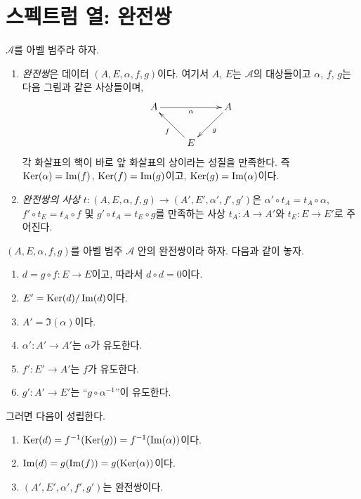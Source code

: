 \section{스펙트럼 열: 완전쌍}
\label{section-exact-couple}

\begin{definition}
\label{definition-exact-couple}
$\mathcal{A}$를 아벨 범주라 하자.
\begin{enumerate}
\item {\it 완전쌍}은 데이터 $(A, E, \alpha, f, g)$이다. 여기서 $A$, $E$는
$\mathcal{A}$의 대상들이고 $\alpha$, $f$, $g$는 다음 그림과 같은
사상들이며,
$$
\xymatrix{
A \ar[rr]_{\alpha} & & A \ar[ld]^g \\
& E \ar[lu]^f &
}
$$
각 화살표의 핵이 바로 앞 화살표의 상이라는 성질을 만족한다. 즉
$\mathop{\mathrm{Ker}}(\alpha) = \mathop{\mathrm{Im}}(f)$,
$\mathop{\mathrm{Ker}}(f) = \mathop{\mathrm{Im}}(g)$이고, $\mathop{\mathrm{Ker}}(g) = \mathop{\mathrm{Im}}(\alpha)$이다.
\item {\it 완전쌍의 사상}
$t : (A, E, \alpha, f, g) \to (A', E', \alpha', f', g')$은
$\alpha' \circ t_A = t_A \circ \alpha$,
$f' \circ t_E = t_A \circ f$ 및
$g' \circ t_A = t_E \circ g$를 만족하는 사상
$t_A : A \to A'$와 $t_E : E \to E'$로 주어진다.
\end{enumerate}
\end{definition}

\begin{lemma}
\label{lemma-derived-exact-couple}
$(A, E, \alpha, f, g)$를 아벨 범주 $\mathcal{A}$ 안의 완전쌍이라 하자.
다음과 같이 놓자.
\begin{enumerate}
\item $d = g \circ f : E \to E$이고, 따라서 $d \circ d = 0$이다.
\item $E' = \mathop{\mathrm{Ker}}(d)/\mathop{\mathrm{Im}}(d)$이다.
\item $A' = \Im(\alpha)$이다.
\item $\alpha' : A' \to A'$는 $\alpha$가 유도한다.
\item $f' : E' \to A'$는 $f$가 유도한다.
\item $g' : A' \to E'$는 ``$g \circ \alpha^{-1}$''이 유도한다.
\end{enumerate}
그러면 다음이 성립한다.
\begin{enumerate}
\item $\mathop{\mathrm{Ker}}(d) = f^{-1}(\mathop{\mathrm{Ker}}(g)) = f^{-1}(\mathop{\mathrm{Im}}(\alpha))$이다.
\item $\mathop{\mathrm{Im}}(d) = g(\mathop{\mathrm{Im}}(f)) = g(\mathop{\mathrm{Ker}}(\alpha))$이다.
\item $(A', E', \alpha', f', g')$는 완전쌍이다.
\end{enumerate}
\end{lemma}

